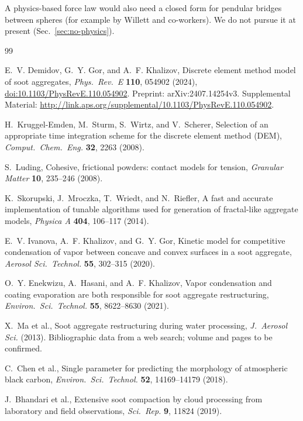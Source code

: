 \documentclass[11pt,a4paper]{article}
\begin{document}
A physics-based force law would also need a closed form for pendular bridges between spheres (for example by Willett and co-workers).
We do not pursue it at present (Sec.~\ref{sec:no-physics}).

\begin{thebibliography}{99}

E.~V. Demidov, G.~Y. Gor, and A.~F. Khalizov,
Discrete element method model of soot aggregates,
\emph{Phys.\ Rev.\ E} \textbf{110}, 054902 (2024),
\href{https://doi.org/10.1103/PhysRevE.110.054902}{doi:10.1103/PhysRevE.110.054902}.
Preprint: arXiv:2407.14254v3.
Supplemental Material: \url{http://link.aps.org/supplemental/10.1103/PhysRevE.110.054902}.

H.~Kruggel-Emden, M.~Sturm, S.~Wirtz, and V.~Scherer,
Selection of an appropriate time integration scheme for the discrete element method (DEM),
\emph{Comput.\ Chem.\ Eng.} \textbf{32}, 2263 (2008).

S.~Luding,
Cohesive, frictional powders: contact models for tension,
\emph{Granular Matter} \textbf{10}, 235--246 (2008).

K.~Skorupski, J.~Mroczka, T.~Wriedt, and N.~Riefler,
A fast and accurate implementation of tunable algorithms used for generation of fractal-like aggregate models,
\emph{Physica A} \textbf{404}, 106--117 (2014).

E.~V. Ivanova, A.~F. Khalizov, and G.~Y. Gor,
Kinetic model for competitive condensation of vapor between concave and convex surfaces in a soot aggregate,
\emph{Aerosol Sci.\ Technol.} \textbf{55}, 302--315 (2020).

O.~Y. Enekwizu, A.~Hasani, and A.~F. Khalizov,
Vapor condensation and coating evaporation are both responsible for soot aggregate restructuring,
\emph{Environ.\ Sci.\ Technol.} \textbf{55}, 8622--8630 (2021).

X.~Ma et al.,
Soot aggregate restructuring during water processing,
\emph{J.\ Aerosol Sci.} (2013).
Bibliographic data from a web search; volume and pages to be confirmed.

C.~Chen et al.,
Single parameter for predicting the morphology of atmospheric black carbon,
\emph{Environ.\ Sci.\ Technol.} \textbf{52}, 14169--14179 (2018).

J.~Bhandari et al.,
Extensive soot compaction by cloud processing from laboratory and field observations,
\emph{Sci.\ Rep.} \textbf{9}, 11824 (2019).


\end{thebibliography}
\end{document}
